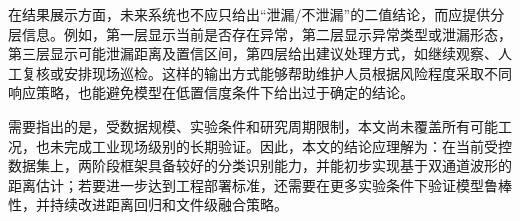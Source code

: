 在结果展示方面，未来系统也不应只给出“泄漏/不泄漏”的二值结论，而应提供分层信息。例如，第一层显示当前是否存在异常，第二层显示异常类型或泄漏形态，第三层显示可能泄漏距离及置信区间，第四层给出建议处理方式，如继续观察、人工复核或安排现场巡检。这样的输出方式能够帮助维护人员根据风险程度采取不同响应策略，也能避免模型在低置信度条件下给出过于确定的结论。

需要指出的是，受数据规模、实验条件和研究周期限制，本文尚未覆盖所有可能工况，也未完成工业现场级别的长期验证。因此，本文的结论应理解为：在当前受控数据集上，两阶段框架具备较好的分类识别能力，并能初步实现基于双通道波形的距离估计；若要进一步达到工程部署标准，还需要在更多实验条件下验证模型鲁棒性，并持续改进距离回归和文件级融合策略。
